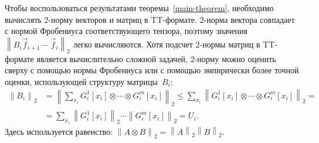 Чтобы воспользоваться результатами теоремы~\ref{main-theorem}, необходимо вычислять 2-норму векторов и матриц в TT\hyp{}формате. 2-норма вектора совпадает с нормой Фробениуса соответствующего тензора, поэтому значения~$\left \| B_i \vec{f}_{i + 1} - \vec{f}_i \right \|_2$ легко вычисляются. Хотя подсчет 2-нормы матриц в TT\hyp{}формате является вычислительно сложной задачей, 2-норму можно оценить сверху с помощью нормы Фробениуса или с помощью эмпирически более точной оценки, использующей структуру матрицы~$B_i$:
\begin{equation}
\label{eq:l2computing}
\begin{aligned}
\left \| B_i \right \|_2 &= \left \| \sum_{x_i} G_i^1 [x_i] \otimes \dotsb \otimes G_i^m [x_i] \right \|_2 \leq
 \sum_{x_i} \left \| G_i^1 [x_i] \otimes \dotsb \otimes G_i^m [x_i] \right \|_2 =\\
& = \sum_{x_i} \left \| G_i^1 [x_i] \right \|_2 \dotsm \left \| G_i^m [x_i] \right \|_2=U_i.
\end{aligned}
\end{equation}
Здесь используется равенство: $\left \| A \otimes B \right \|_2 = \left \| A \right \|_2 \left \| B \right \|_2$.




